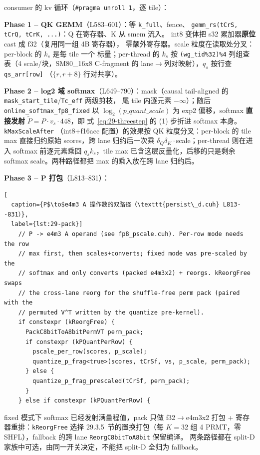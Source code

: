 consumer 的 kv 循环（\texttt{\#pragma unroll 1}，逐 tile）：

\textbf{Phase 1 -- QK GEMM}（L583--601）：等 \texttt{k\_full}、fence、
\texttt{gemm\_rs(tCrS, tCrQ, tCrK, ...)}：Q 在寄存器、K 从 smem 流入。
int8 变体把 s32 累加器\textbf{原位} cast 成 f32（复用同一组 4B 寄存器），
零额外寄存器。scale 粒度在读取处分叉：per-block 的 $k_s$ 是每 tile 一个
标量；per-thread 的 $k_s$ 按
\texttt{(wg\_tid\%32)\%4} 列组查表（4 scale/块，SM80\_16x8 C-fragment 的
lane$\to$列对映射），$q_s$ 按行查 \texttt{qs\_arr[row]}
（$\{r,r{+}8\}$ 行对共享）。

\textbf{Phase 2 -- log2 域 softmax}（L649--790）：mask（causal
tail-aligned 的 \texttt{mask\_start\_tile}/\texttt{Tc\_eff} 两级剪枝，
尾 tile 内逐元素 $-\infty$）；随后
\texttt{online\_softmax\_fp8\_fixed} 以 $\log_2(p\_quant\_scale)$ 为
exp2 偏移，softmax \textbf{直接发射} $\tilde P = P\cdot v_s\cdot448$，即
式~\ref{eq:29-threestep} 的 (1) 步折进 softmax 本身。\texttt{kMaxScaleAfter}
（int8+f16acc 配置）的效果按 QK 粒度分叉：per-block 的 tile max 直接归约原始
scores，跨 lane 归约后一次乘 $\delta_Q\delta_K\cdot$scale；per-thread 则在进入
softmax 前逐元素乘回 $q_sk_s$，tile max 已含这层反量化，后移的只是剩余
softmax scale。两种路径都把 max 的乘入放在跨 lane 归约后。

\textbf{Phase 3 -- P 打包}（L813--831）：

\begin{lstlisting}[
  caption={P$\to$e4m3 A 操作数的双路径（\texttt{persist\_d.cuh} L813--831）},
  label={lst:29-pack}]
    // P -> e4m3 A operand (see fp8_pscale.cuh). Per-row mode needs the row
    // max first, then scales+converts; fixed mode was pre-scaled by the
    // softmax and only converts (packed e4m3x2) + reorgs. kReorgFree swaps
    // the cross-lane reorg for the shuffle-free perm pack (paired with the
    // permuted V^T written by the quantize pre-kernel).
    if constexpr (kReorgFree) {
      PackC8bitToA8bitPermVT perm_pack;
      if constexpr (kPQuantPerRow) {
        pscale_per_row(scores, p_scale);
        quantize_p_frag<true>(scores, tCrSf, vs, p_scale, perm_pack);
      } else {
        quantize_p_frag_prescaled(tCrSf, perm_pack);
      }
    } else if constexpr (kPQuantPerRow) {
\end{lstlisting}

fixed 模式下 softmax 已经发射满量程值，pack 只做 f32$\to$e4m3x2 打包 +
寄存器重排：\texttt{kReorgFree} 选择 29.3.5~节的置换打包（每 $K{=}32$ 组
4 PRMT，零 SHFL），fallback 的跨 lane \texttt{ReorgC8bitToA8bit} 保留编译。
两条路径都在 split-D 家族中可选，由同一开关决定，不能把 split-D 全归为 fallback。

